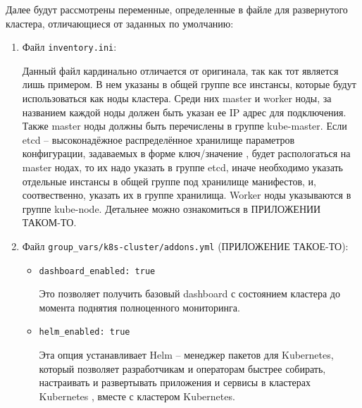 Далее будут рассмотрены переменные, определенные в файле для развернутого кластера, отличающиеся от заданных по умолчанию:
\begin{enumerate}
    \item Файл \texttt{inventory.ini}:

        Данный файл кардинально отличается от оригинала, так как тот является лишь примером. В нем указаны в общей группе все инстансы, которые будут использоваться как ноды кластера. Среди них master 
        и worker
        ноды, за названием каждой ноды должен быть указан ее IP
        адрес для подключения. Также master ноды должны быть перечислены в группе kube-master. Если etcd -- высоконадёжное распределённое хранилище параметров конфигурации, задаваемых в форме ключ/значение \cite{def:etcd},
        будет распологаться на master нодах, то их надо указать в группе etcd, иначе необходимо указать отдельные инстансы в общей группе под хранилище манифестов, и, соотвественно, указать их в группе хранилища. Worker ноды указываются в группе kube-node. Детальнее можно ознакомиться в ПРИЛОЖЕНИИ ТАКОМ-ТО.

    \item Файл \texttt{group\_vars/k8s-cluster/addons.yml} (ПРИЛОЖЕНИЕ ТАКОЕ-ТО):
        \begin{itemize}
            \item \texttt{dashboard\_enabled: true}

                Это позволяет получить базовый dashboard
                с состоянием кластера до момента поднятия полноценного мониторинга.

            \item \texttt{helm\_enabled: true}

                Эта опция устанавливает Helm -- менеджер пакетов для Kubernetes, который позволяет разработчикам и операторам быстрее собирать, настраивать и развертывать приложения и сервисы в кластерах Kubernetes \cite{def:helm},
                вместе с кластером Kubernetes.


\end{itemize}
\end{enumerate}
